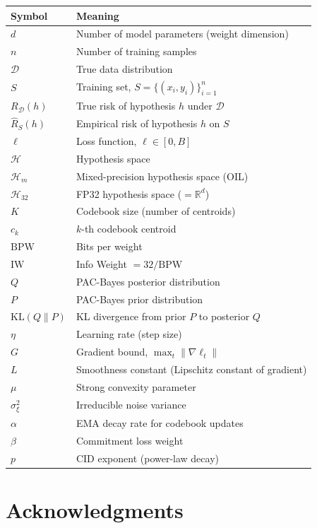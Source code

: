 \documentclass[11pt,a4paper,twoside]{report}
\theoremstyle{definition}
\newcommand{\IW}{\mathrm{IW}}
\newcommand{\KL}{\mathrm{KL}}
\begin{document}
\begin{longtable}{l P{8cm}}
\toprule
\textbf{Symbol} & \textbf{Meaning} \\
\midrule
\endhead
$d$ & Number of model parameters (weight dimension) \\
$n$ & Number of training samples \\
$\mathcal{D}$ & True data distribution \\
$S$ & Training set, $S = \{(x_i, y_i)\}_{i=1}^n$ \\
$R_{\mathcal{D}}(h)$ & True risk of hypothesis $h$ under $\mathcal{D}$ \\
$\hat{R}_S(h)$ & Empirical risk of hypothesis $h$ on $S$ \\
$\ell$ & Loss function, $\ell \in [0, B]$ \\
$\mathcal{H}$ & Hypothesis space \\
$\mathcal{H}_m$ & Mixed-precision hypothesis space (OIL) \\
$\mathcal{H}_{32}$ & FP32 hypothesis space ($= \mathbb{R}^d$) \\
$K$ & Codebook size (number of centroids) \\
$c_k$ & $k$-th codebook centroid \\
$\mathrm{BPW}$ & Bits per weight \\
$\IW$ & Info Weight $= 32 / \mathrm{BPW}$ \\
$Q$ & PAC-Bayes posterior distribution \\
$P$ & PAC-Bayes prior distribution \\
$\KL(Q \| P)$ & KL divergence from prior $P$ to posterior $Q$ \\
$\eta$ & Learning rate (step size) \\
$G$ & Gradient bound, $\max_t \|\nabla \ell_t\|$ \\
$L$ & Smoothness constant (Lipschitz constant of gradient) \\
$\mu$ & Strong convexity parameter \\
$\sigma_\xi^2$ & Irreducible noise variance \\
$\alpha$ & EMA decay rate for codebook updates \\
$\beta$ & Commitment loss weight \\
$p$ & CID exponent (power-law decay) \\
\bottomrule
\end{longtable}

\chapter*{Acknowledgments}
\end{document}
